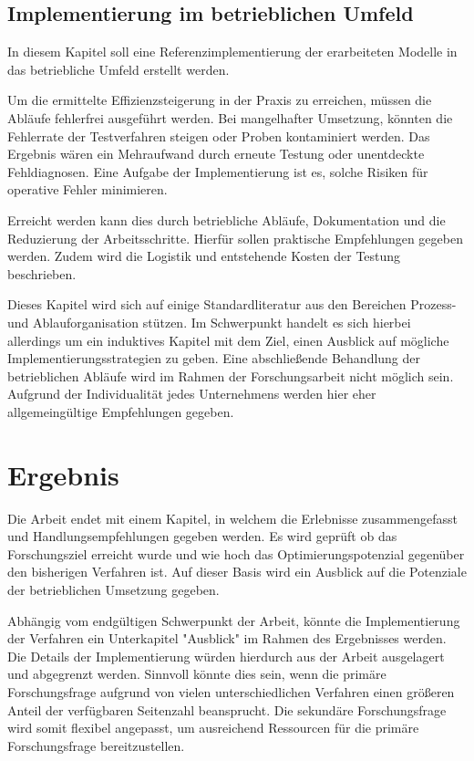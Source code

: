 \subsection{Implementierung im betrieblichen Umfeld}
In diesem Kapitel soll eine Referenzimplementierung der erarbeiteten Modelle in das betriebliche Umfeld erstellt werden.

Um die ermittelte Effizienzsteigerung in der Praxis zu erreichen, müssen die Abläufe fehlerfrei ausgeführt werden.
Bei mangelhafter Umsetzung, könnten die Fehlerrate der Testverfahren steigen oder Proben kontaminiert werden.
Das Ergebnis wären ein Mehraufwand durch erneute Testung oder unentdeckte Fehldiagnosen.
Eine Aufgabe der Implementierung ist es, solche Risiken für operative Fehler minimieren.

Erreicht werden kann dies durch betriebliche Abläufe, Dokumentation und die Reduzierung der Arbeitsschritte.
Hierfür sollen praktische Empfehlungen gegeben werden.
Zudem wird die Logistik und entstehende Kosten der Testung beschrieben.

Dieses Kapitel wird sich auf einige Standardliteratur aus den Bereichen Prozess- und Ablauforganisation stützen.
Im Schwerpunkt handelt es sich hierbei allerdings um ein induktives Kapitel mit dem Ziel, einen Ausblick auf mögliche Implementierungsstrategien zu geben.
Eine abschließende Behandlung der betrieblichen Abläufe wird im Rahmen der Forschungsarbeit nicht möglich sein.
Aufgrund der Individualität jedes Unternehmens werden hier eher allgemeingültige Empfehlungen gegeben.

\section{Ergebnis}
Die Arbeit endet mit einem Kapitel, in welchem die Erlebnisse zusammengefasst und Handlungsempfehlungen gegeben werden.
Es wird geprüft ob das Forschungsziel erreicht wurde und wie hoch das Optimierungspotenzial gegenüber den bisherigen Verfahren ist.
Auf dieser Basis wird ein Ausblick auf die Potenziale der betrieblichen Umsetzung gegeben.

Abhängig vom endgültigen Schwerpunkt der Arbeit, könnte die Implementierung der Verfahren ein Unterkapitel "Ausblick" im Rahmen des Ergebnisses werden.
Die Details der Implementierung würden hierdurch aus der Arbeit ausgelagert und abgegrenzt werden.
Sinnvoll könnte dies sein, wenn die primäre Forschungsfrage aufgrund von vielen unterschiedlichen Verfahren einen größeren Anteil der verfügbaren Seitenzahl beansprucht.
Die sekundäre Forschungsfrage wird somit flexibel angepasst, um ausreichend Ressourcen für die primäre Forschungsfrage bereitzustellen.


